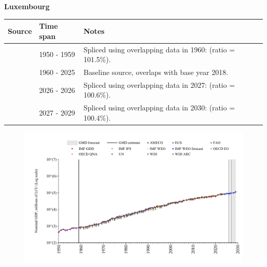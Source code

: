 \documentclass[12pt,a4paper,landscape]{article}
\begin{document}
\begin{adjustbox}{max totalsize={\paperwidth}{\paperheight},center}
\begin{minipage}[t][\textheight][t]{\textwidth}
\vspace*{0.5cm}
{}
\begin{center}
{\Large\bfseries Luxembourg}
\end{center}
\vspace{0.5cm}
\begin{table}[H]
\centering
\small
\begin{tabular}{|l|l|l|}
\hline
\textbf{Source} & \textbf{Time span} & \textbf{Notes} \\
\hline
\rowcolor{white}\cite{IMF_GDD}& 1950 - 1959 &Spliced using overlapping data in 1960: (ratio = 101.5\%).\\
\rowcolor{lightgray}\cite{OECD_EO}& 1960 - 2025 &Baseline source, overlaps with base year 2018.\\
\rowcolor{white}\cite{AMECO}& 2026 - 2026 &Spliced using overlapping data in 2027: (ratio = 100.6\%).\\
\rowcolor{lightgray}\cite{IMF_WEO_forecast}& 2027 - 2029 &Spliced using overlapping data in 2030: (ratio = 100.4\%).\\
\hline
\end{tabular}
\end{table}
\begin{figure}[H]
\centering
\includegraphics[width=\textwidth,height=0.6\textheight,keepaspectratio]{graphs/LUX_nGDP.pdf}
\end{figure}
\end{minipage}
\end{adjustbox}
\end{document}
